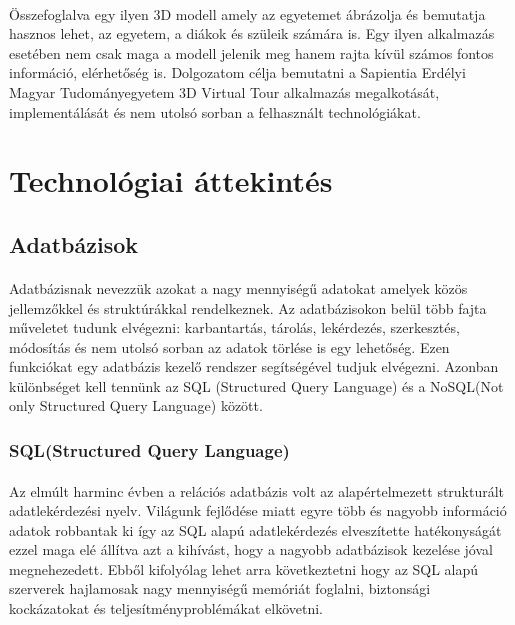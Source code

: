 \documentclass{article}
\begin{document}
	\paragraph{}
	Összefoglalva egy ilyen 3D modell amely az egyetemet ábrázolja és bemutatja hasznos lehet, az egyetem, a diákok és szüleik számára is. Egy ilyen alkalmazás esetében nem csak maga a modell jelenik meg hanem rajta kívül számos fontos információ, elérhetőség is. Dolgozatom célja bemutatni a Sapientia Erdélyi Magyar Tudományegyetem 3D Virtual Tour alkalmazás megalkotását, implementálását és nem utolsó sorban a felhasznált technológiákat.
	
	\newpage
	
	\section{Technológiai áttekintés}
	
	\subsection{Adatbázisok}
	\paragraph{}
	Adatbázisnak nevezzük azokat a nagy mennyiségű adatokat amelyek közös jellemzőkkel és struktúrákkal rendelkeznek. Az adatbázisokon belül több fajta műveletet tudunk elvégezni: karbantartás, tárolás, lekérdezés, szerkesztés, módosítás és nem utolsó sorban az adatok törlése is egy lehetőség. Ezen funkciókat egy adatbázis kezelő rendszer segítségével tudjuk elvégezni.\cite{dbms} Azonban különbséget kell tennünk az SQL (Structured Query Language) és a NoSQL(Not only Structured Query Language) között.
	\subsubsection{SQL(Structured Query Language)}
	\paragraph{}
	Az elmúlt harminc évben a relációs adatbázis volt az alapértelmezett strukturált adatlekérdezési nyelv. Világunk fejlődése miatt egyre több és nagyobb információ adatok robbantak ki így az SQL alapú adatlekérdezés elveszítette hatékonyságát ezzel maga elé állítva azt a kihívást, hogy a nagyobb adatbázisok kezelése jóval megnehezedett. Ebből kifolyólag lehet arra következtetni hogy az SQL alapú szerverek hajlamosak nagy mennyiségű memóriát foglalni, biztonsági kockázatokat és teljesítményproblémákat elkövetni.\cite{venkatraman2016sql} 
	
\end{document}
